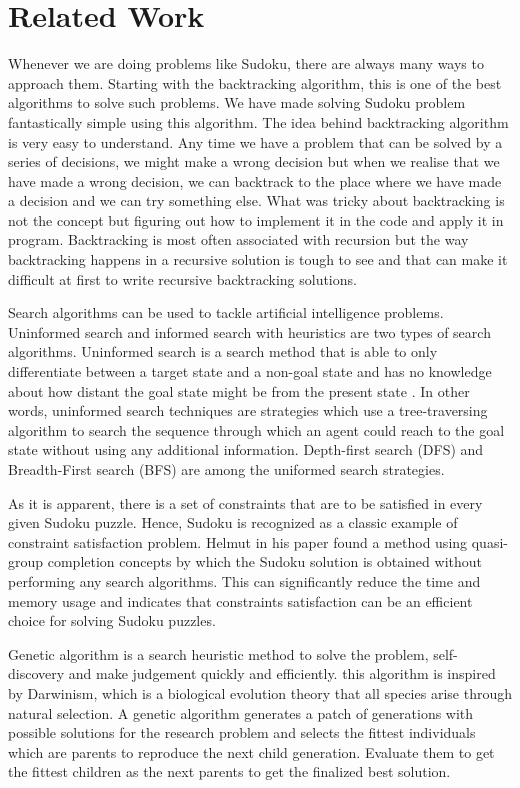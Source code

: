 \section{Related Work}

Whenever we are doing problems like Sudoku, there are always many ways to approach them. Starting with the backtracking algorithm, this is one of the best algorithms to solve such problems. We have made solving Sudoku problem fantastically simple using this algorithm.
The idea behind backtracking algorithm is very easy to understand. Any time we have a problem that can be solved by a series of decisions, we might make a wrong decision but when we realise that we have made a wrong decision, we can backtrack to the place where we have made a decision and we can try something else.
What was tricky about backtracking is not the concept but figuring out how to implement it in the code and apply it in program. Backtracking is most often associated with recursion but the way backtracking happens in a recursive solution is tough to see and that can make it difficult at first to write recursive backtracking solutions.

Search algorithms can be used to tackle artificial intelligence problems. Uninformed search and informed search with heuristics are two types of search algorithms. Uninformed search is a search method that is able to only differentiate between a target state and a non-goal state and has no knowledge about how distant the goal state might be from the present state \cite{bib_search}. In other words, uninformed search techniques are strategies which use a tree-traversing algorithm to search the sequence through which an agent could reach to the goal state without using any additional information. Depth-first search (DFS) and Breadth-First search (BFS) are among the uniformed search strategies.

As it is apparent, there is a set of constraints that are to be satisfied in every given Sudoku puzzle. Hence, Sudoku is recognized as a classic example of constraint satisfaction problem. Helmut in his paper \cite{bib_constraint} found a method using quasi-group completion concepts by which the Sudoku solution is obtained without performing any search algorithms. This can significantly reduce the time and memory usage and indicates that constraints satisfaction can be an efficient choice for solving Sudoku puzzles.

Genetic algorithm is a search heuristic method to solve the problem, self-discovery and make judgement quickly and efficiently. this algorithm is inspired by Darwinism, which is a biological evolution theory that all species arise through natural selection. A genetic algorithm generates a patch of generations with possible solutions for the research problem and selects the fittest individuals which are parents to reproduce the next child generation. Evaluate them to get the fittest children as the next parents to get the finalized best solution.
